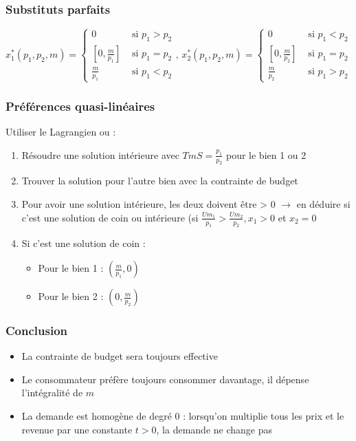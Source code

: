 \subsubsection{Substituts parfaits}

\begin{equation*}
x^*_1(p_1,p_2,m) =
\begin{cases}
	0 &\text{ si } p_1 > p_2\\
	[0, \frac{m}{p_1}] &\text{ si } p_1 = p_2\\
	\frac{m}{p_1} &\text{ si } p_1 < p_2
\end{cases}
\text{, }
x^*_2(p_1,p_2,m) =
\begin{cases}
	0 &\text{ si } p_1 < p_2\\
	[0, \frac{m}{p_2}] &\text{ si } p_1 = p_2\\
	\frac{m}{p_2} &\text{ si } p_1 > p_2
\end{cases}
\end{equation*}

\subsubsection{Préférences quasi-linéaires}

Utiliser le Lagrangien ou :
\begin{enumerate}
\item Résoudre une solution intérieure avec $TmS = \frac{p_1}{p_2}$ pour le bien 1 ou 2
\item Trouver la solution pour l'autre bien avec la contrainte de budget
\item Pour avoir une solution intérieure, les deux doivent être > 0 $\rightarrow$ en déduire si c'est une solution de coin ou intérieure (si $\frac{Um_1}{p_1} > \frac{Um_2}{p_2}, x_1 > 0$ et $x_2 = 0$
\item Si c'est une solution de coin :
\begin{itemize}
\item Pour le bien 1 : $(\frac{m}{p_1}, 0)$
\item Pour le bien 2 : $(0, \frac{m}{p_2})$
\end{itemize}
\end{enumerate}

\subsubsection{Conclusion}

\begin{itemize}
\item La contrainte de budget sera toujours effective
\item Le consommateur préfère toujours consommer davantage, il dépense l'intégralité de $m$
\item La demande est homogène de degré 0 : lorsqu'on multiplie tous les prix et le revenue par une constante $t > 0$, la demande ne change pas
\end{itemize}


